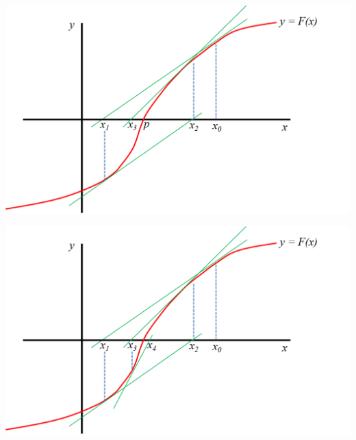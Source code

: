 \documentclass[]{book}
\begin{document}
\begin{center}\includegraphics[width=0.9\linewidth]{Plots/U2/nr4} \end{center}

\begin{center}\includegraphics[width=0.9\linewidth]{Plots/U2/nr} \end{center}
\end{document}
